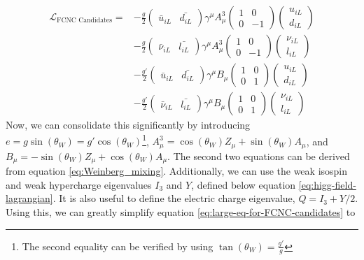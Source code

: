 \begin{equation}
\begin{split}
\mathcal{L}_{\text{FCNC Candidates}} = &-\frac{g}{2}\begin{pmatrix}
\bar{u}_{iL} & \bar{d_{iL}}
\end{pmatrix} \gamma^\mu A_{\mu}^3 \begin{pmatrix}
1 & 0 \\ 0 & -1
\end{pmatrix} \begin{pmatrix}
u_{iL} \\ d_{iL}
\end{pmatrix} \\
&-\frac{g}{2}\begin{pmatrix}
\bar{\nu}_{iL} & \bar{l_{iL}}
\end{pmatrix} \gamma^\mu A_{\mu}^3 \begin{pmatrix}
1 & 0 \\ 0 & -1
\end{pmatrix} \begin{pmatrix}
\nu_{iL} \\ l_{iL}
\end{pmatrix} \\
&-\frac{g'}{2}\begin{pmatrix}
\bar{u}_{iL} & \bar{d_{iL}}
\end{pmatrix} \gamma^\mu B_{\mu} \begin{pmatrix}
1 & 0 \\ 0 & 1
\end{pmatrix} \begin{pmatrix}
u_{iL} \\ d_{iL}
\end{pmatrix} \\
&-\frac{g'}{2}\begin{pmatrix}
\bar{\nu}_{iL} & \bar{l_{iL}}
\end{pmatrix} \gamma^\mu B_{\mu} \begin{pmatrix}
1 & 0 \\ 0 & 1
\end{pmatrix} \begin{pmatrix}
\nu_{iL} \\ l_{iL}
\end{pmatrix}
\label{eq:large-eq-for-FCNC-candidates}
\end{split}
\end{equation}
Now, we can consolidate this significantly by introducing $e = g\sin(\theta_W) = g'\cos(\theta_W)$\footnote{The second equality can be verified by using $\tan(\theta_W) = \frac{g'}{g}$}, $A^3_\mu = \cos(\theta_W)Z_\mu + \sin(\theta_W)A_\mu$, and $B_\mu = -\sin(\theta_W)Z_\mu + \cos(\theta_W) A_\mu$. The second two equations can be derived from equation \ref{eq:Weinberg_mixing}. Additionally, we can use the weak isospin and weak hypercharge eigenvalues $I_3$ and $Y$, defined below equation \ref{eq:higg-field-lagrangian}.  It is also useful to define the electric charge eigenvalue, $Q = I_3 + Y/2$. Using this, we can greatly simplify equation \ref{eq:large-eq-for-FCNC-candidates} to
